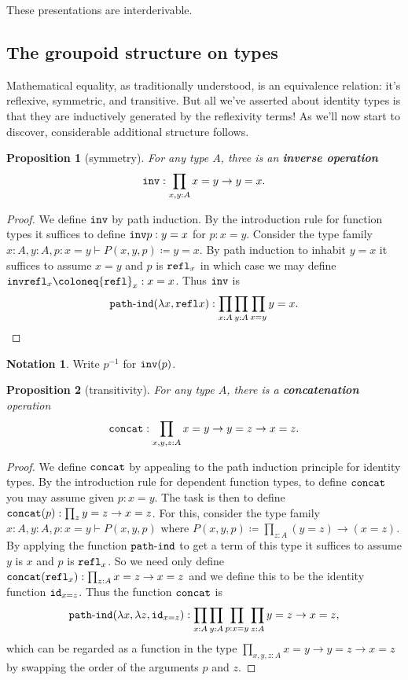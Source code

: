 \documentclass{amsart}
\theoremstyle{theorem}
\newtheorem*{prop}{Proposition}
\theoremstyle{definition}
\newtheorem*{ntn}{Notation}
\theoremstyle{remark}
\newcommand{\0}{\mathbbe{0}}
\newcommand{\1}{\mathbbe{1}}
\newcommand{\2}{\mathbbe{2}}
\newcommand{\3}{\mathbbe{3}}
\newcommand{\4}{\mathbbe{4}}
\newcommand{\term}[1]{{\textup{\texttt{#1}}}}
\newcommand{\id}{\term{id}}
\newcommand{\refl}{\term{refl}}
\newcommand{\pathind}{\term{path}\text{-}\term{ind}}
\newcommand{\concat}{\term{concat}}
\newcommand{\inv}{\term{inv}}
\begin{document}
These presentations are interderivable.

\subsection*{The groupoid structure on types}

Mathematical equality, as traditionally understood, is an equivalence relation: it's reflexive, symmetric, and transitive. But all we've asserted about identity types is that they are inductively generated by the reflexivity terms! As we'll now start to discover, considerable additional structure follows.

\begin{prop}[symmetry] For any type $A$, three is an  \textbf{inverse operation}
\[ \inv : \prod_{x, y :A} x = y \to y =x.\]
\end{prop}
\begin{proof}
We define $\inv$ by path induction. By the introduction rule for function types it suffices to define $\inv p : y =x$ for $p : x = y$. Consider the type family $x : A, y : A, p: x = y \vdash P(x,y,p) \coloneq y = x$. By path induction to inhabit $y=x$ it suffices to assume $x = y$ and $p$ is $\refl_x$ in which case we may define $\inv \refl_x \coloneq \refl_x : x=x$. Thus $\inv$ is
\[ \pathind (\lambda x, \refl x) : \prod_{x :A} \prod_{y :A} \prod_{x = y} y =x.\]
\end{proof}

\begin{ntn} Write $p^{-1}$ for $\inv(p)$.
\end{ntn}

\begin{prop}[transitivity]
For any type $A$, there is a  \textbf{concatenation} operation
\[ \concat : \prod_{x,y,z :A} x= y \to y=z \to x = z.\] 
\end{prop}
\begin{proof}
We define $\concat$ by appealing to the path induction principle for identity types. 
By the introduction rule for dependent function types, to define $\concat$ you may assume given $p : x=y$. The task is then to define $\concat (p) : \prod_{z} y =z \to x = z$.  For this, consider the type family $x :A , y : A, p : x = y \vdash P(x,y,p)$ where $P(x,y,p) \coloneq \prod_{z : A} (y = z) \to (x = z)$. By applying the function $\pathind$ to get a term of this type it suffices to assume $y$ is $x$ and $p$ is $\refl_x$. So we need only define $\concat( \refl_x) : \prod_{z :A} x =z \to x = z$ and we define this to be the identity function $\id_{x = z}$. Thus the function $\concat$ is 
\[  \pathind( \lambda x, \lambda z, \id_{x=z}) : \prod_{x :A}\prod_{y :A} \prod_{p : x = y} \prod_{z :A} y=z \to x =z,\]
which can be regarded as a function in the type $\prod_{x,y,z :A} x= y \to y=z \to x = z$ by swapping the order of the arguments $p$ and $z$.
\end{proof}
\end{document}
